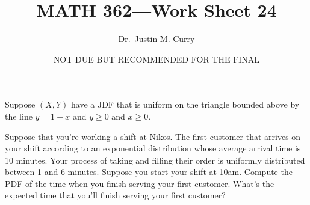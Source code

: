 \documentclass[addpoints,12pt]{exam}
\title{\vspace{-1in} MATH 362---Work Sheet 24}
\date{NOT DUE BUT RECOMMENDED FOR THE FINAL}
\author{Dr.~Justin M. Curry}
\begin{document}
\maketitle





\begin{questions}

\question Suppose $(X,Y)$ have a JDF that is uniform on the triangle bounded above by the line $y=1-x$ and $y\geq 0$ and $x\geq 0$. 


\noaddpoints
{}
\addpoints

\newpage
\question Suppose that you're working a shift at Nikos. The first customer that arrives on your shift according to an exponential distribution whose average arrival time is 10 minutes. Your process of taking and filling their order is uniformly distributed between 1 and 6 minutes.  Suppose you start your shift at 10am. Compute the PDF of the time when you finish serving your first customer. What's the expected time that you'll finish serving your first customer?


\end{questions}
\end{document}
